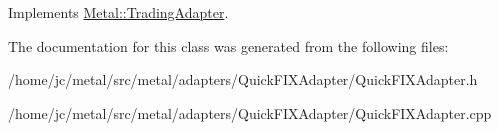 Implements \hyperlink{classMetal_1_1TradingAdapter_a39562015df3e7202a5e8f932b8bde43e}{Metal\+::\+Trading\+Adapter}.



The documentation for this class was generated from the following files\+:\begin{DoxyCompactItemize}
\item 
/home/jc/metal/src/metal/adapters/\+Quick\+F\+I\+X\+Adapter/Quick\+F\+I\+X\+Adapter.\+h\item 
/home/jc/metal/src/metal/adapters/\+Quick\+F\+I\+X\+Adapter/Quick\+F\+I\+X\+Adapter.\+cpp\end{DoxyCompactItemize}
